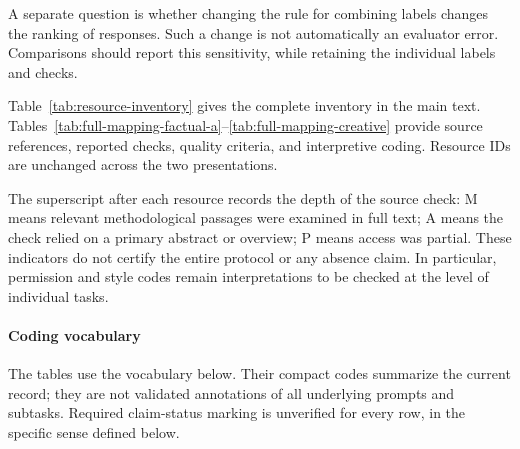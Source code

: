 \documentclass{clv2025}
\begin{document}
A separate question is whether changing the rule for combining labels changes
the ranking of responses. Such a change is not automatically an evaluator
error. Comparisons should report this sensitivity, while retaining the
individual labels and checks.

%
\makeatletter\def\@currentlabel{B}\makeatother\label{app:mapping}
\renewcommand*{\theHtable}{B.\arabic{table}}

Table~\ref{tab:resource-inventory} gives the complete inventory in the
main text. Tables~\ref{tab:full-mapping-factual-a}--\ref{tab:full-mapping-creative}
provide source references, reported checks, quality criteria, and interpretive
coding. Resource IDs are unchanged across the two presentations.

The superscript after each resource records the depth of the source check:
M means relevant methodological passages were examined in full text;
A means the check relied on a primary abstract or overview;
P means access was partial. These indicators do not certify the entire
protocol or any absence claim. In particular, permission and style codes
remain interpretations to be checked at the level of individual tasks.

\paragraph{Coding vocabulary}
The tables use the vocabulary below. Their compact codes summarize the
current record; they are not validated annotations of all underlying
prompts and subtasks. Required claim-status marking is unverified for
every row, in the specific sense defined below.
\end{document}
